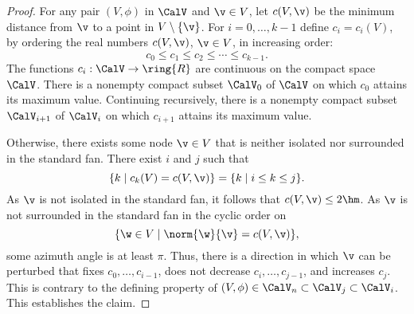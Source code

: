 \begin{proof}


For any pair $(V,\phi)$ in $\CalV$ and $\v\in V$, let
$c(V,\v)$ be the minimum distance from $\v$ to a point in
$V\setminus \{\v\}$.  For $i=0,\ldots,k-1$ define
$c_i=c_i(V)$, by ordering the real numbers
$c(V,\v)$, $\v\in V$,  in increasing order:
\[ 
c_0 \le c_1 \le c_2 \le \cdots \le c_{k-1}.
\] 
The functions $c_i:\CalV\to\ring{R}$ are  continuous on the
compact  space $\CalV$.  There is a nonempty compact
subset $\CalV_0$ of $\CalV$ on which $c_0$ attains its maximum
value. Continuing recursively, there is a nonempty compact subset
$\CalV_{i+1}$ of $\CalV_{i}$ on which $c_{i+1}$ attains its maximum value.
%


Otherwise, there exists some node $\v\in V$ 
that is neither isolated nor surrounded in the standard fan.
There exist $i$ and $j$ such that
\[ 
\{k\mid c_k(V) = c(V,\v)\} = \{k\mid i\le k\le j\}.
\] 
As $\v$ is not isolated in the standard fan, it
follows that $c(V,\v) \le 2\hm$.  As $\v$ is not surrounded in the
standard fan in the cyclic order on
\[ 
\{\w\in V \mid \norm{\w}{\v} = c(V,\v)\},
\] 
some azimuth angle is at least $\pi$.
Thus, there is a direction in which $\v$ can be perturbed
that  fixes $c_0,\ldots,c_{i-1}$, does not decrease $c_i,\ldots,c_{j-1}$, and increases $c_j$.
This is contrary to the defining property of
$(V,\phi)\in\CalV_n\subset\CalV_j\subset\CalV_i$.  This establishes the claim.
\end{proof}



